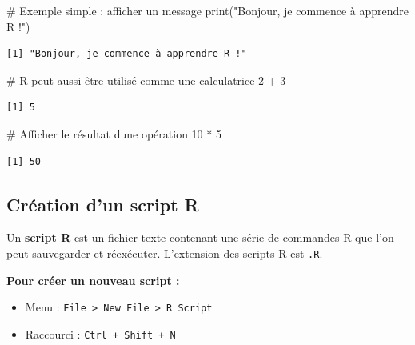 \documentclass[
  french,
  11pt,
  a4paper,
]{article}
\newenvironment{Shaded}{}{}
\newcommand{\CommentTok}[1]{\textcolor[rgb]{0.42,0.45,0.49}{#1}}
\newcommand{\DecValTok}[1]{\textcolor[rgb]{0.00,0.36,0.77}{#1}}
\newcommand{\FunctionTok}[1]{\textcolor[rgb]{0.44,0.26,0.76}{#1}}
\newcommand{\NormalTok}[1]{\textcolor[rgb]{0.14,0.16,0.18}{#1}}
\newcommand{\SpecialCharTok}[1]{\textcolor[rgb]{0.00,0.36,0.77}{#1}}
\newcommand{\StringTok}[1]{\textcolor[rgb]{0.01,0.18,0.38}{#1}}
\providecommand{\tightlist}{%
  \setlength{\itemsep}{0pt}\setlength{\parskip}{0pt}}
\begin{document}
\begin{Shaded}
\begin{Highlighting}[]
\CommentTok{\# Exemple simple : afficher un message}
\FunctionTok{print}\NormalTok{(}\StringTok{"Bonjour, je commence à apprendre R !"}\NormalTok{)}
\end{Highlighting}
\end{Shaded}

\begin{verbatim}
[1] "Bonjour, je commence à apprendre R !"
\end{verbatim}

\begin{Shaded}
\begin{Highlighting}[]
\CommentTok{\# R peut aussi être utilisé comme une calculatrice}
\DecValTok{2} \SpecialCharTok{+} \DecValTok{3}
\end{Highlighting}
\end{Shaded}

\begin{verbatim}
[1] 5
\end{verbatim}

\begin{Shaded}
\begin{Highlighting}[]
\CommentTok{\# Afficher le résultat d\textquotesingle{}une opération}
\DecValTok{10} \SpecialCharTok{*} \DecValTok{5}
\end{Highlighting}
\end{Shaded}

\begin{verbatim}
[1] 50
\end{verbatim}

\subsection{Création d'un script R}\label{cruxe9ation-dun-script-r}

Un \textbf{script R} est un fichier texte contenant une série de
commandes R que l'on peut sauvegarder et réexécuter. L'extension des
scripts R est \texttt{.R}.

\textbf{Pour créer un nouveau script :}

\begin{itemize}
\tightlist
\item
  Menu :
  \texttt{File\ \textgreater{}\ New\ File\ \textgreater{}\ R\ Script}
\item
  Raccourci : \texttt{Ctrl\ +\ Shift\ +\ N}
\end{itemize}
\end{document}

